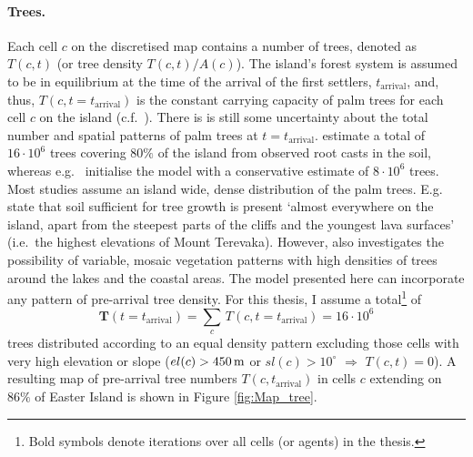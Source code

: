 \paragraph{Trees.}
Each cell $c$ on the discretised map contains a number of trees, denoted as $T(c,t)$ (or tree density $T(c,t)/A(c)$).
The island's forest system is assumed to be in equilibrium at the time of the arrival of the first settlers, $t_\text{arrival}$, and, thus, $T(c,t=t_\text{arrival})$ is the constant carrying capacity of palm trees for each cell $c$ on the island (c.f.\ ).
There is is still some uncertainty about the total number and spatial patterns of palm trees at $t=t_\text{arrival}$.
\citet{Mieth2015} estimate a total of $16\cdot 10^6$ trees covering $80\%$ of the island from observed root casts in the soil, whereas e.g.\ \citet{Brandt2015} initialise the model with a conservative estimate of $8\cdot 10^6$ trees. 
Most studies assume an island wide, dense distribution of the palm trees. 
E.g.\ \citet{Bahn2017} state that soil sufficient for tree growth is present `almost everywhere on the island, apart from the steepest parts of the cliffs and the youngest lava surfaces' (i.e.\ the highest elevations of Mount Terevaka). 
However, \citet{Rull2020} also investigates the possibility of variable, mosaic vegetation patterns with high densities of trees around the lakes and the coastal areas.
The model presented here can incorporate any pattern of pre-arrival tree density. 
For this thesis, I assume a total\footnote{Bold symbols denote iterations over all cells (or agents) in the thesis.} of 
\begin{equation}
\mathbf{T}(t=t_\text{arrival}) = \sum_{c} \, T(c,t=t_\text{arrival}) =  16 \cdot 10^6
\end{equation} 
trees distributed according to an equal density pattern excluding those cells with very high elevation or slope ($el(c)>450\, {\rm m}$ or $sl(c)>10^\circ$ $\Rightarrow$ $T(c,t) = 0$).
A resulting map of pre-arrival tree numbers $T(c,t_\text{arrival})$ in cells $c$ extending on $86\%$ of Easter Island is shown in Figure \ref{fig:Map_tree}.

